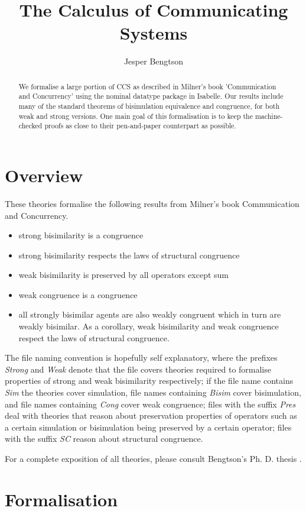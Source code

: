 \documentclass[11pt,a4paper]{article}
\begin{document}
\title{The Calculus of Communicating Systems}
\author{Jesper Bengtson}
\maketitle

\begin{abstract}
We formalise a large portion of CCS as described in Milner's book 'Communication and Concurrency' using the nominal datatype package in Isabelle. Our results include many of the standard theorems of bisimulation equivalence and congruence, for both weak and strong versions. One main goal of this formalisation is to keep the machine-checked proofs as close to their pen-and-paper counterpart as possible.
\end{abstract}

\tableofcontents

\section{Overview}

These theories formalise the following  results from Milner's book Communication and Concurrency.

\begin{itemize}
\item strong bisimilarity is a congruence
\item strong bisimilarity respects the laws of structural congruence
\item weak bisimilarity is preserved by all operators except sum
\item weak congruence is a congruence
\item all strongly bisimilar agents are also weakly congruent which in turn
 are weakly bisimilar. As a corollary, weak bisimilarity and weak
 congruence respect the laws of structural congruence.
\end{itemize}

The file naming convention is hopefully self explanatory, where the
prefixes \emph{Strong} and \emph{Weak} denote that the file covers theories
required to formalise properties of strong and weak bisimilarity
respectively; if the file name contains \emph{Sim} the theories
cover simulation, file names containing \emph{Bisim} cover bisimulation,
and file names containing \emph{Cong} cover weak congruence; files with the
suffix \emph{Pres} deal with theories that reason about preservation
properties of operators such as a certain simulation or bisimulation
being preserved by a certain operator; files with the suffix \emph{SC} reason
about structural congruence.

For a complete exposition of all theories, please consult Bengtson's
Ph. D. thesis \cite{bengtson:thesis}.

\section{Formalisation}





\end{document}
